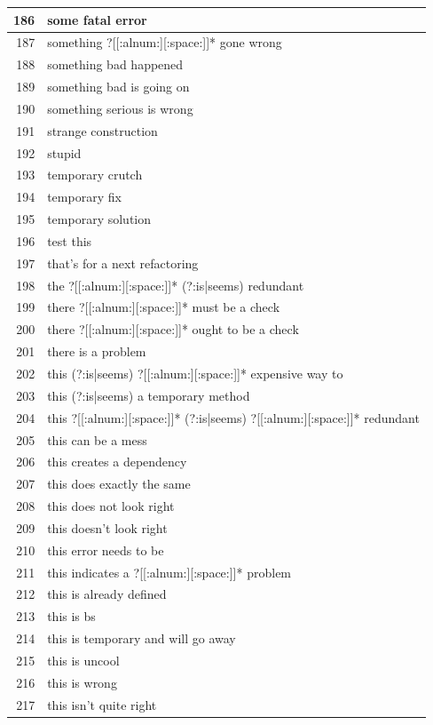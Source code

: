 \documentclass[
]{article}
\begin{document}
\begin{longtable}{r|l}
\hline
186 & some fatal error\\
\hline
187 & something ?[[:alnum:][:space:]]* gone wrong\\
\hline
188 & something bad happened\\
\hline
189 & something bad is going on\\
\hline
190 & something serious is wrong\\
\hline
191 & strange construction\\
\hline
192 & stupid\\
\hline
193 & temporary crutch\\
\hline
194 & temporary fix\\
\hline
195 & temporary solution\\
\hline
196 & test this\\
\hline
197 & that's for a next refactoring\\
\hline
198 & the ?[[:alnum:][:space:]]* (?:is|seems) redundant\\
\hline
199 & there ?[[:alnum:][:space:]]* must be a check\\
\hline
200 & there ?[[:alnum:][:space:]]* ought to be a check\\
\hline
201 & there is a problem\\
\hline
202 & this (?:is|seems) ?[[:alnum:][:space:]]* expensive way to\\
\hline
203 & this (?:is|seems) a temporary method\\
\hline
204 & this ?[[:alnum:][:space:]]* (?:is|seems) ?[[:alnum:][:space:]]* redundant\\
\hline
205 & this can be a mess\\
\hline
206 & this creates a dependency\\
\hline
207 & this does exactly the same\\
\hline
208 & this does not look right\\
\hline
209 & this doesn't look right\\
\hline
210 & this error needs to be\\
\hline
211 & this indicates a ?[[:alnum:][:space:]]* problem\\
\hline
212 & this is already defined\\
\hline
213 & this is bs\\
\hline
214 & this is temporary and will go away\\
\hline
215 & this is uncool\\
\hline
216 & this is wrong\\
\hline
217 & this isn't quite right\\

\end{longtable}
\end{document}
